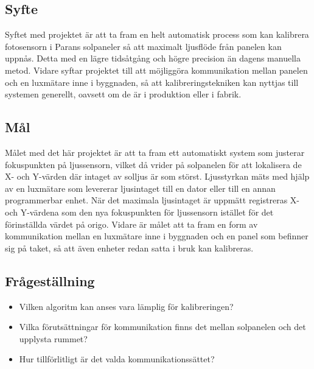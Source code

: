     \subsection{Syfte} %
    \label{sub:syfte}
          Syftet med projektet är att ta fram en helt automatisk process som kan kalibrera fotosensorn i Parans solpaneler så att maximalt ljusflöde från panelen kan uppnås. Detta med en lägre tidsåtgång och högre precision än dagens manuella metod. 
          Vidare syftar projektet till att möjliggöra kommunikation mellan panelen och en lux\-mätare inne i byggnaden, så att kalibreringstekniken kan nyttjas till systemen generellt, oavsett om de är i produktion eller i fabrik.

    \subsection{Mål} %
    \label{sub:mal}
        Målet med det här projektet är att ta fram ett automatiskt system som justerar fokuspunkten på ljussensorn, vilket då vrider på solpanelen för att lokalisera de X- och Y-värden där intaget av solljus är som störst. 
        Ljusstyrkan mäts med hjälp av en luxmätare som levererar ljusintaget till en dator eller till en annan programmerbar enhet. 
        När det maximala ljusintaget är uppmätt registreras X- och Y-värdena som den nya fokuspunkten för ljussensorn istället för det förinställda värdet på origo. 
        Vidare är målet att ta fram en form av kommunikation mellan en luxmätare inne i byggnaden och en panel som befinner sig på taket, så att även enheter redan satta i bruk kan kalibreras. 


    \subsection{Frågeställning} %
    \label{sub:fragestallning}
        \begin{itemize}
            \item Vilken algoritm kan anses vara lämplig för kalibreringen?\\
            \item Vilka förutsättningar för kommunikation finns det mellan solpanelen och det upplysta rummet? \\
            \item Hur tillförlitligt är det valda kommunikationssättet? \\
            
        \end{itemize}

